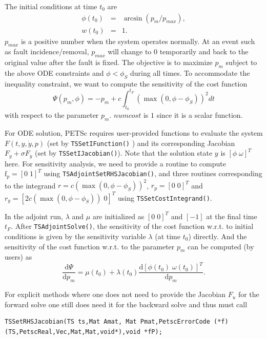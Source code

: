 The initial conditions at time $t_0$ are
%
\begin{eqnarray*}
\phi(t_0) &=& \arcsin \left( p_m / p_{max} \right), \\
w(t_0) & =& 1.
\end{eqnarray*}
%
$p_{max}$ is a positive number when the system operates normally. At an event such as fault incidence/removal, $p_{max}$ will change to $0$ temporarily and back to the original value after the fault is fixed.
The objective is to maximize $p_m$ subject to the above ODE constraints and $\phi<\phi_S$ during all times.
To accommodate the inequality constraint, we want to compute the sensitivity of the cost function
%
\[
\Psi(p_m,\phi) = -p_m + c \int_{t_0}^{t_F} \left( \max(0, \phi - \phi_S ) \right)^2 dt
\]
%
with respect to the parameter $p_m$. $numcost$ is $1$ since it is a scalar function.

For ODE solution, PETSc requires user-provided functions to evaluate the system $F(t,y,\dot{y},p)$ (set by \lstinline{TSSetIFunction()} )
and its corresponding Jacobian $F_y + \sigma F_{\dot y}$ (set by \lstinline{TSSetIJacobian()}).
Note that the solution state $y$ is $[ \phi \;  \omega ]^T$ here.
For sensitivity analysis, we need to provide a routine to compute $\mathrm{f}_p=[0 \; 1]^T$ using \lstinline{TSAdjointSetRHSJacobian()},
and three routines corresponding to the integrand $r=c \left( \max(0, \phi - \phi_S ) \right)^2$, $r_p = [0 \; 0]^T$ and $r_y= [ 2 c \left( \max(0, \phi - \phi_S ) \right) \; 0]^T$ using \lstinline{TSSetCostIntegrand()}.

In the adjoint run, $\lambda$ and $\mu$ are initialized as $[ 0 \;  0 ]^T$ and $[-1]$ at the final time $t_F$.
After \lstinline{TSAdjointSolve()}, the sensitivity of the cost function w.r.t. to initial conditions is given by the sensitivity variable $\lambda$ (at time $t_0$) directly.
And the sensitivity of the cost function w.r.t. to the parameter $p_m$ can be computed (by users) as
%
\[
\frac{\mathrm{d} \Psi}{\mathrm{d} p_m} = \mu(t_0) + \lambda(t_0)  \frac{\mathrm{d} \left[ \phi(t_0) \; \omega(t_0) \right]^T}{\mathrm{d} p_m}  .
\]

For explicit methods where one does not need to provide the
Jacobian $F_u$ for the forward solve one still does need it for the
backward solve and thus must call
\begin{lstlisting}
TSSetRHSJacobian(TS ts,Mat Amat, Mat Pmat,PetscErrorCode (*f)(TS,PetscReal,Vec,Mat,Mat,void*),void *fP);
\end{lstlisting}

